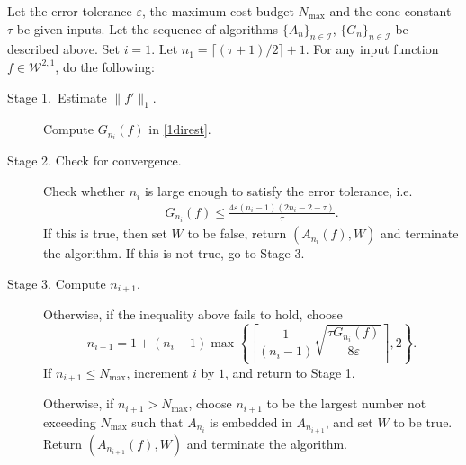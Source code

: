 \begin{algo} \label{multistageintegalgo}
Let the error tolerance $\varepsilon$, the maximum cost budget $N_{\text{max}}$ and the cone constant $\tau$ be given inputs. Let the sequence of algorithms $\{A_n\}_{n\in \mathcal{I}}$, $\{G_n\}_{n\in \mathcal{I}}$ be described above. Set $i=1$. Let $n_1=\lceil(\tau+1)/2\rceil+1$. For any input function $f\in \mathcal{W}^{2,1}$, do the following:
\begin{description}
\item[Stage 1.\ Estimate {$\|f'\|_{1}$}.] Compute $G_{n_i}(f)$ in \eqref{1direst}.

\item[Stage 2. Check for convergence.] Check whether $n_i$ is large enough to satisfy the error tolerance, i.e.
    \begin{align*}
     G_{n_i}(f) \le \frac{4\varepsilon(n_i-1)(2n_i-2 - \tau)}{\tau}.
    \end{align*}
    If this is true, then set $W$ to be false, return $(A_{n_i}(f),W)$ and terminate the algorithm. If this is not true, go to Stage 3.

\item[Stage 3. Compute $n_{i+1}$.] Otherwise, if the inequality above fails to hold,
choose
$$
n_{i+1}=1+ (n_i-1)\max\left\{\left\lceil\frac{1}{(n_i-1)}\sqrt{\frac{\tau G_{n_i}(f)}{8\varepsilon}}\right\rceil,2\right\}.
$$
If $n_{i+1} \le N_{\max}$, increment $i$ by $1$, and return to Stage 1.

Otherwise, if $n_{i+1} > N_{\max}$, choose $n_{i+1}$ to be the largest number not exceeding $N_{\max}$ such that $A_{n_{i}}$ is embedded in $A_{n_{i+1}}$, and set $W$ to be true. Return $(A_{n_{i+1}}(f),W)$ and terminate the algorithm.
\end{description}
\end{algo}

